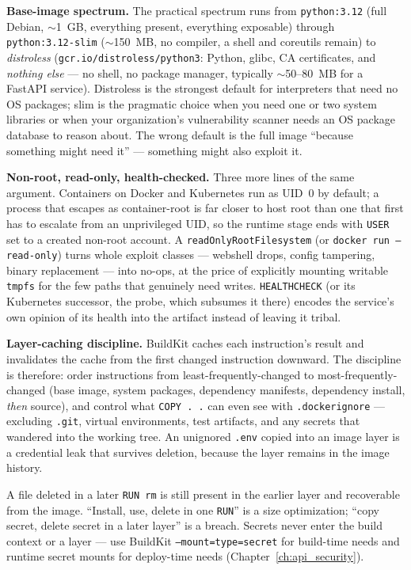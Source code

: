 \textbf{Base-image spectrum.} The practical spectrum runs from
\texttt{python:3.12} (full Debian, $\sim$1~GB, everything present,
everything exposable) through \texttt{python:3.12-slim}
($\sim$150~MB, no compiler, a shell and coreutils remain) to
\textit{distroless}
(\texttt{gcr.io/distroless/python3}: Python, glibc, CA certificates, and
\emph{nothing else} --- no shell, no package manager, typically
$\sim$50--80~MB for a FastAPI service). Distroless is the strongest
default for interpreters that need no OS packages; slim is the pragmatic
choice when you need one or two system libraries or when your
organization's vulnerability scanner needs an OS package database to
reason about. The wrong default is the full image ``because something
might need it'' --- something might also exploit it.

\textbf{Non-root, read-only, health-checked.} Three more lines of the
same argument. Containers on Docker and Kubernetes run as UID~0 by
default; a process that escapes as container-root is far closer to host
root than one that first has to escalate from an unprivileged UID, so the
runtime stage ends with \texttt{USER} set to a created non-root account.
A \texttt{readOnlyRootFilesystem} (or \texttt{docker run --read-only})
turns whole exploit classes --- webshell drops, config tampering, binary
replacement --- into no-ops, at the price of explicitly mounting writable
\texttt{tmpfs} for the few paths that genuinely need writes.
\texttt{HEALTHCHECK} (or its Kubernetes successor, the probe, which
subsumes it there) encodes the service's own opinion of its health into
the artifact instead of leaving it tribal.

\textbf{Layer-caching discipline.} BuildKit caches each instruction's
result and invalidates the cache from the first changed instruction
downward. The discipline is therefore: order instructions from
least-frequently-changed to most-frequently-changed (base image, system
packages, dependency manifests, dependency install, \emph{then} source),
and control what \texttt{COPY . .} can even see with
\texttt{.dockerignore} --- excluding \texttt{.git}, virtual environments,
test artifacts, and any secrets that wandered into the working tree. An
unignored \texttt{.env} copied into an image layer is a credential leak
that survives deletion, because the layer remains in the image history.

\begin{warningbox}
A file deleted in a later \texttt{RUN rm} is still present in the earlier
layer and recoverable from the image. ``Install, use, delete in one
\texttt{RUN}'' is a size optimization; ``copy secret, delete secret in a
later layer'' is a breach. Secrets never enter the build context or a
layer --- use BuildKit \texttt{--mount=type=secret} for build-time needs
and runtime secret mounts for deploy-time needs
(Chapter~\ref{ch:api_security}).
\end{warningbox}

